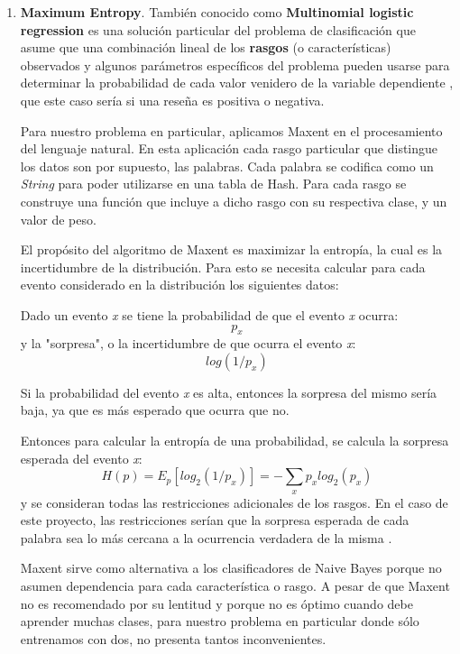 \documentclass[hidelinks]{sig-alternate-05-2015}
\begin{document}
\begin{enumerate}
\item \textbf{Maximum Entropy}. También conocido como \textbf{Multinomial logistic regression} es una solución particular del problema de clasificación que asume que una combinación lineal de los \textbf{rasgos} (o características) observados y algunos parámetros específicos del problema pueden usarse para determinar la probabilidad de cada valor venidero de la variable dependiente \cite{wikipedia:maxent}, que este caso sería si una reseña es positiva o negativa.

Para nuestro problema en particular, aplicamos Maxent en el procesamiento del lenguaje natural. En esta aplicación cada rasgo particular que distingue los datos son por supuesto, las palabras. Cada palabra se codifica como un \textit{String} para poder utilizarse en una tabla de Hash. Para cada rasgo se construye una función que incluye a dicho rasgo con su respectiva clase, y un valor de peso. 
 
El propósito del algoritmo de Maxent es maximizar la entropía, la cual es la incertidumbre de la distribución. Para esto se necesita calcular para cada evento considerado en la distribución los siguientes datos:

Dado un evento \textit{x} se tiene la probabilidad de que el evento \textit{x} ocurra: \begin{displaymath}p_x\end{displaymath} y la "sorpresa", o la incertidumbre de que ocurra el evento \textit{x}: \begin{displaymath}log(1/p_x)\end{displaymath}

Si la probabilidad del evento \textit{x} es alta, entonces la sorpresa del mismo sería baja, ya que es más esperado que ocurra que no. 

Entonces para calcular la entropía de una probabilidad, se calcula la sorpresa esperada del evento \textit{x}:\begin{displaymath}H(p) = E_{p}[log_2(1/p_x)] = -\sum_{x} p_{x} log_2(p_{x}) \end{displaymath} y se consideran todas las restricciones adicionales de los rasgos. 
En el caso de este proyecto, las restricciones serían que la sorpresa esperada de cada palabra sea lo más cercana a la ocurrencia verdadera de la misma \cite{jurafsky:maxent}. 

Maxent sirve como alternativa a los clasificadores de Naive Bayes porque no asumen dependencia para cada característica o rasgo. A pesar de que Maxent no es recomendado por su lentitud y porque no es óptimo cuando debe aprender muchas clases, para nuestro problema en particular donde sólo entrenamos con dos, no presenta tantos inconvenientes. 

\end{enumerate}
\end{document}
